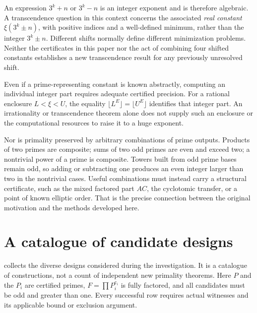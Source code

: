 \documentclass[11pt,a4paper]{article}
\theoremstyle{definition}\newtheorem{definition}[theorem]{Definition}
\theoremstyle{remark}\newtheorem{remark}[theorem]{Remark}
\begin{document}
An expression $3^k+n$ or $3^k-n$ is an integer exponent and is therefore
algebraic. A transcendence question in this context concerns the associated
\emph{real constant} $\xi(3^k\pm n)$, with positive indices and a well-defined
minimum, rather than the integer $3^k\pm n$. Different shifts normally
define different minimization problems. Neither the certificates in this
paper nor the act of combining four shifted constants establishes a new
transcendence result for any previously unresolved shift.

Even if a prime-representing constant is known abstractly, computing an
individual integer part requires adequate certified precision. For a rational
enclosure $L<\xi<U$, the equality
$\lfloor L^E\rfloor=\lfloor U^E\rfloor$ identifies that integer part.
An irrationality or transcendence theorem alone does not supply such an
enclosure or the computational resources to raise it to a huge exponent.

Nor is primality preserved by arbitrary combinations of prime outputs.
Products of two primes are composite; sums of two odd primes are even and
exceed two; a nontrivial power of a prime is composite. Towers built from odd
prime bases remain odd, so adding or subtracting one produces an even integer
larger than two in the nontrivial cases. Useful combinations must instead
carry a structural certificate, such as the mixed factored part $AC$,
the cyclotomic transfer, or a point of known elliptic order. That is the
precise connection between the original motivation and the methods developed
here.

\section{A catalogue of candidate designs}
\label{sec:catalogue}

 collects the diverse designs considered during the
investigation. It is a catalogue of constructions, not a count of independent
new primality theorems. Here $P$ and the $P_i$ are certified primes,
$F=\prod P_i^{e_i}$ is fully factored, and all candidates must be odd and
greater than one. Every successful row requires actual witnesses and its
applicable bound or exclusion argument.
\end{document}
